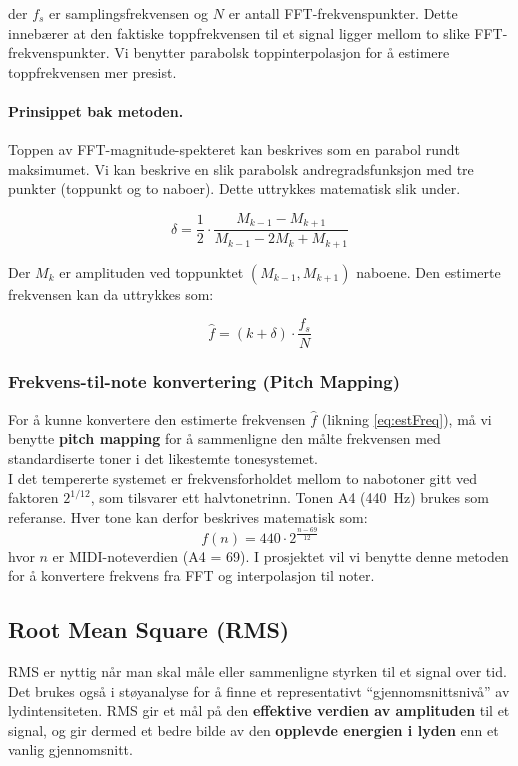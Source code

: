 \noindent
der $f_s$ er samplingsfrekvensen og $N$ er antall FFT-frekvenspunkter. Dette innebærer at den faktiske toppfrekvensen til et signal ligger mellom to slike FFT-frekvenspunkter. Vi benytter parabolsk toppinterpolasjon for å estimere toppfrekvensen mer presist. \\
\paragraph{Prinsippet bak metoden.} Toppen av FFT-magnitude-spekteret kan beskrives som en parabol rundt maksimumet. Vi kan beskrive en slik parabolsk andregradsfunksjon med tre punkter (toppunkt og to naboer). Dette uttrykkes matematisk slik under.


\[
\delta = \frac{1}{2} \cdot \frac{M_{k-1} - M_{k + 1}}{M_{k - 1} - 2M_k + M_{k + 1}}
\]

\noindent
Der $M_k$ er amplituden ved toppunktet $(M_{k-1}, M_{k + 1})$ naboene. Den estimerte frekvensen kan da uttrykkes som:

\begin{equation}
    \hat{f}=\left( k + \delta \right) \cdot \frac{f_s}{N}
    \label{eq:estFreq}
\end{equation}


\subsubsection{Frekvens-til-note konvertering (Pitch Mapping)}

For å kunne konvertere den estimerte frekvensen $\hat{f}$ (likning \ref{eq:estFreq}), må vi benytte \textbf{pitch mapping} for å sammenligne den målte frekvensen med standardiserte toner i det likestemte tonesystemet. \\
I det tempererte systemet er frekvensforholdet mellom to nabotoner gitt ved faktoren $2^{1/12}$, som tilsvarer ett halvtonetrinn. 
Tonen A4 (440~Hz) brukes som referanse. 
Hver tone kan derfor beskrives matematisk som:
\[
f(n) = 440 \cdot 2^{\frac{n - 69}{12}}
\]
hvor $n$ er MIDI-noteverdien (A4 = 69). I prosjektet vil vi benytte denne metoden for å konvertere frekvens fra FFT og interpolasjon til noter.


\subsection{Root Mean Square (RMS)}
RMS er nyttig når man skal måle eller sammenligne styrken til et signal over tid. Det brukes også i støyanalyse for å finne et representativt “gjennomsnittsnivå” av lydintensiteten. RMS gir et mål på den \textbf{effektive verdien av amplituden} til et signal, og gir dermed et bedre bilde av den \textbf{opplevde energien i lyden} enn et vanlig gjennomsnitt.

